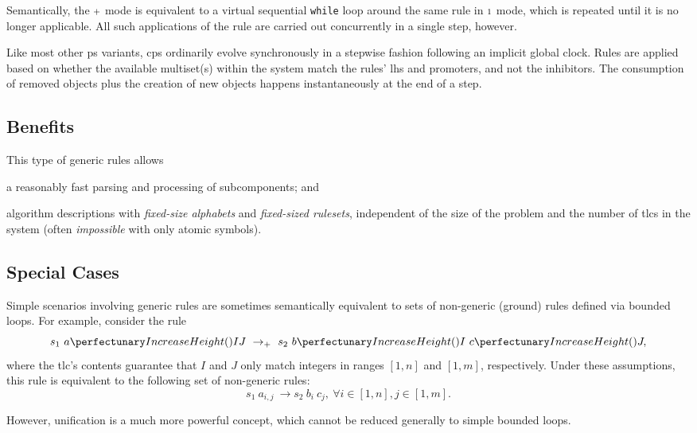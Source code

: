Semantically, the \({\scriptstyle +}\) mode is equivalent to a virtual sequential \texttt{while} loop around the same rule in \({\scriptstyle 1}\) mode, which is repeated until it is no longer applicable.  All such applications of the rule are carried out concurrently in a single step, however.

Like most other \gls{ps} variants, \gls{cps} ordinarily evolve synchronously in a stepwise fashion following an implicit global clock.  Rules are applied based on whether the available multiset(s) within the system match the rules' \gls{lhs} and \glspl{promoter}, and not the \glspl{inhibitor}.  The consumption of removed objects plus the creation of new objects happens instantaneously at the end of a step.

\subsection{Benefits}
This type of generic rules allows
\begin{inparaenum}[(i)]
\item a reasonably fast parsing and processing of subcomponents; and
\item algorithm descriptions with \emph{fixed-size alphabets} and \emph{fixed-sized \glspl{ruleset}}, 
independent of the size of the problem and the number of \glspl{tlc} in the system (often \emph{impossible} with only atomic symbols).
\end{inparaenum}

\subsection{Special Cases}
Simple scenarios involving generic rules are sometimes 
semantically equivalent to sets of non-generic (ground) rules defined via bounded loops.
For example, consider the rule
\[
s_1 ~ \cpfunc{a}{IJ} ~ \rightarrow_\cpmaxpar ~ s_2 ~ \cpfunc{b}{I} ~ \cpfunc{c}{J},
\]
where the \gls{tlc}'s contents guarantee that \(I\) and \(J\) 
only match integers in ranges \([1,n]\) and \([1,m]\), respectively.
Under these assumptions, 
this rule is equivalent to the following set of non-generic rules:
\[
s_1 ~ a_{i,j} ~ \rightarrow s_2 ~ b_i ~ c_j, ~ \forall i \in [1,n], j \in [1,m].
\]

However, unification is a much more powerful concept, 
which cannot be reduced generally to simple bounded loops.